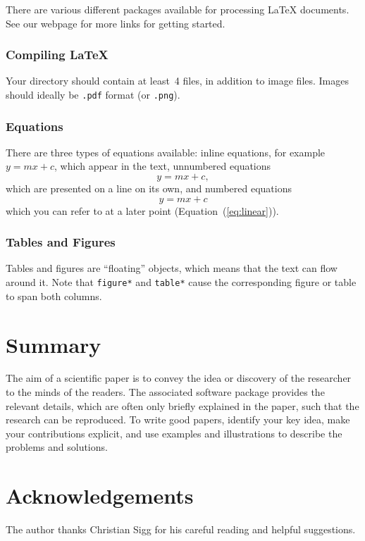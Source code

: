 \documentclass[10pt,conference,compsocconf]{IEEEtran}
\begin{document}
There are various different packages available for processing \LaTeX{}
documents. See our webpage for more links for getting started.

\subsubsection{Compiling \LaTeX{}}
Your directory should contain at least~4 files, in addition to image
files. Images should ideally be
\texttt{.pdf} format (or \texttt{.png}).

\subsubsection{Equations}

There are three types of equations available: inline equations, for
example $y=mx + c$, which appear in the text, unnumbered equations
$$y=mx + c,$$
which are presented on a line on its own, and numbered equations
\begin{equation}
  \label{eq:linear}
  y = mx + c
\end{equation}
which you can refer to at a later point (Equation~(\ref{eq:linear})).

\subsubsection{Tables and Figures}

Tables and figures are ``floating'' objects, which means that the text
can flow around it.
Note that \texttt{figure*} and \texttt{table*} cause the corresponding
figure or table to span both columns.



\section{Summary}

The aim of a scientific paper is to convey the idea or discovery of
the researcher to the minds of the readers. The associated software
package provides the relevant details, which are often only briefly
explained in the paper, such that the research can be reproduced.
To write good papers, identify your key idea, make your contributions
explicit, and use examples and illustrations to describe the problems
and solutions.

\section*{Acknowledgements}
The author thanks Christian Sigg for his careful reading and helpful
suggestions.

\newpage


\end{document}
